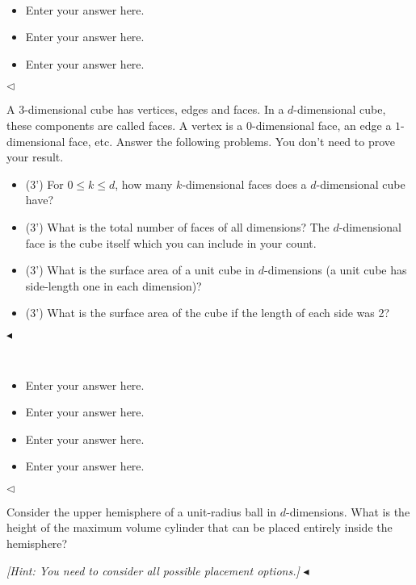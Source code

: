 \documentclass[11pt]{article}
\newenvironment{problem}[2][Problem]{\begin{trivlist}
\item[\hskip \labelsep {\bfseries #1}\hskip \labelsep {\bfseries #2.}]}{\hfill$\blacktriangleleft$\end{trivlist}}
\newenvironment{answer}[1][Answer]{\begin{trivlist}
\item[\hskip \labelsep {\bfseries #1.}\hskip \labelsep]}{\hfill$\lhd$\end{trivlist}}
\begin{document}
\begin{answer} ~
\begin{itemize}
    \item [(1)] Enter your answer here.
    \item [(2)] Enter your answer here.
    \item [(3)] Enter your answer here. 
\end{itemize}
\end{answer}



\begin{problem}{6 (12')}
A 3-dimensional cube has vertices, edges and faces. In a $d$-dimensional cube, these components are called faces. A vertex is a $0$-dimensional face, an edge a $1$-dimensional face, etc. Answer the following problems. You don't need to prove your result.
\begin{itemize}
    \item [(1)] (3') For $0\leq k\leq d$, how many $k$-dimensional faces does a $d$-dimensional cube have?
    \item [(2)] (3') What is the total number of faces of all dimensions? The $d$-dimensional face is the cube itself which you can include in your count.
    \item [(3)] (3') What is the surface area of a unit cube in $d$-dimensions (a unit cube has side-length one in each dimension)?
    \item [(4)] (3') What is the surface area of the cube if the length of each side was 2?
\end{itemize}
\end{problem}

\begin{answer} ~
\begin{itemize}
    \item [(1)] Enter your answer here.
    \item [(2)] Enter your answer here.
    \item [(3)] Enter your answer here. 
    \item [(4)] Enter your answer here.
\end{itemize}
\end{answer}



\begin{problem}{7 (16')}
Consider the upper hemisphere of a unit-radius ball in $d$-dimensions. What is the height of the maximum volume cylinder that can be placed entirely inside the hemisphere?

\textit{[Hint: You need to consider all possible placement options.]}
\end{problem}
\end{document}

